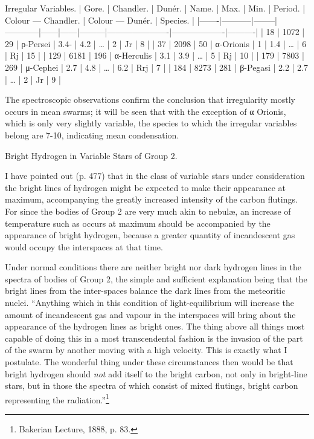 \documentclass[a4paper, 12pt, oneside, polutonikogreek, english]{article}
\begin{document}
Irregular Variables. 
| Gore. | Chandler. | Dunér. | Name.   | Max. | Min. | Period. | Colour --- Chandler. | Colour --- Dunér. | Species. |
|-------|-----------|--------|------------|------|------|---------|----------------------|-------------------|----------|
| 18  | 1072   | 29   | ρ-Persei  | 3.4- | 4.2 | …    | 2          | Jr        | 8    |
| 37  | 2098   | 50   | α-Orionis | 1  | 1.4 | …    | 6          | Rj        | 15    |
| 129  | 6181   | 196  | α-Herculis | 3.1 | 3.9 | …    | 5          | Rj        | 10    |
| 179  | 7803   | 269  | μ-Cephei  | 2.7 | 4.8 | …    | 6.2         | Rrj        | 7    |
| 184  | 8273   | 281  | β-Pegasi  | 2.2 | 2.7 | …    | 2          | Jr        | 9    |

The spectroscopic observations confirm the conclusion that irregularity mostly occurs in mean swarms; it will be seen that with the exception of α Orionis, which is only very slightly variable, the species to which the irregular variables belong are 7-10, indicating mean condensation.

Bright Hydrogen in Variable Stars of Group 2.

I have pointed out (p. 477) that in the class of variable stars under consideration the bright lines of hydrogen might be expected to make their appearance at maximum, accompanying the greatly increased intensity of the carbon flutings. For since the bodies of Group 2 are very much akin to nebulæ, an increase of temperature such as occurs at maximum should be accompanied by the appearance of bright hydrogen, because a greater quantity of incandescent gas would occupy the interspaces at that time.

Under normal conditions there are neither bright nor dark hydrogen lines in the spectra of bodies of Group 2, the simple and sufficient explanation being that the bright lines from the inter-spaces balance the dark lines from the meteoritic nuclei. ``Anything which in this condition of light-equilibrium will increase the amount of incandescent gas and vapour in the interspaces will bring about the appearance of the hydrogen lines as bright ones. The thing above all things most capable of doing this in a most transcendental fashion is the invasion of the part of the swarm by another moving with a high velocity. This is exactly what I postulate. The wonderful thing under these circumstances then would be that bright hydrogen should \emph{not} add itself to the bright carbon, not only in bright-line stars, but in those the spectra of which consist of mixed flutings, bright carbon representing the radiation.''\footnote{Bakerian Lecture, 1888, p. 83.}
\end{document}
